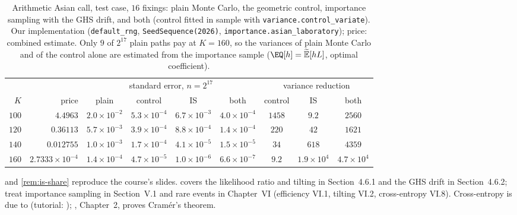 \begin{table}[ht]
  \centering
  \small\setlength{\tabcolsep}{4.5pt}
  \begin{tabular}{@{}rr@{\quad}cccc@{\quad}ccc@{}}
    \toprule
    & & \multicolumn{4}{c}{standard error, $n=2^{17}$} & \multicolumn{3}{c}{variance reduction} \\
    $K$ & price & plain & control & IS & both & control & IS & both \\
    \midrule
    $100$ & $4.4963$ & $2.0\times10^{-2}$ & $5.3\times10^{-4}$ & $6.7\times10^{-3}$ & $4.0\times10^{-4}$ & $1458$ & $9.2$ & $2560$ \\
    $120$ & $0.36113$ & $5.7\times10^{-3}$ & $3.9\times10^{-4}$ & $8.8\times10^{-4}$ & $1.4\times10^{-4}$ & $220$ & $42$ & $1621$ \\
    $140$ & $0.012755$ & $1.0\times10^{-3}$ & $1.7\times10^{-4}$ & $4.1\times10^{-5}$ & $1.5\times10^{-5}$ & $34$ & $618$ & $4359$ \\
    $160$ & $2.7333\times10^{-4}$ & $1.4\times10^{-4}$ & $4.7\times10^{-5}$ & $1.0\times10^{-6}$ & $6.6\times10^{-7}$ & $9.2$ & $1.9\times10^4$ & $4.7\times10^4$ \\
    \bottomrule
  \end{tabular}
  \caption{Arithmetic Asian call, test case, $16$ fixings: plain Monte Carlo, the geometric
    control, importance sampling with the GHS drift, and both (control fitted in sample with
    \texttt{variance.control\_variate}). Our implementation (\texttt{default\_rng},
    \texttt{SeedSequence(2026)}, \texttt{importance.asian\_laboratory}); price: combined
    estimate. Only $9$ of $2^{17}$ plain paths pay at $K=160$, so the variances of plain Monte
    Carlo and of the control alone are estimated from the importance sample
    ($\EQ[h]=\Et[hL]$, optimal coefficient).}
  \label{tab:is-lab}
\end{table}


\furtherreading
{} and \cref{rem:is-share} reproduce the course's
slides. \textcite{glasserman-mc} covers the likelihood ratio and tilting in Section~4.6.1 and
the GHS drift in Section~4.6.2; \textcite{asmussen-glynn} treat importance sampling in
Section~V.1 and rare events in Chapter~VI (efficiency VI.1, tilting VI.2, cross-entropy VI.8).
Cross-entropy is due to \textcite{rubinstein-ce} (tutorial: \textcite{deboer-ce});
\textcite{dembo-zeitouni}, Chapter~2, proves Cramér's theorem.
